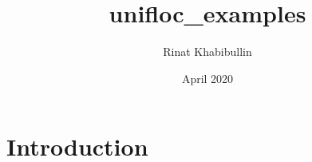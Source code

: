 \documentclass{article}
\title{unifloc_examples}
\author{Rinat Khabibullin}
\date{April 2020}
\begin{document}
\maketitle

\section{Introduction}
\end{document}
